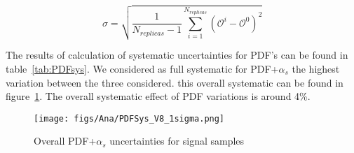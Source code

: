 \begin{equation} \label{eq:quadsumNNPDF}
\sigma = \sqrt{\frac{1}{N_{replicas}-1}\sum_{i=1}^{N_{replicas}}(\mathcal{O}^{i}-\mathcal{O}^{0})^{2}} 
\end{equation}

The results of calculation of systematic uncertainties for PDF's can be found in table~\ref{tab:PDFsys}. We considered as full systematic for PDF+$\alpha_{s}$ the highest variation between the three considered. this overall systematic can be found in figure~\ref{fig:TotalPDFSys}. The overall systematic effect of PDF variations is around 4\%.

\begin{table*}[htbH]
\begin{center}
\caption{PDF+$\alpha_{s}$ uncertainties for signal samples\label{tab:PDFsys}}
\end{center}
\end{table*}

\begin{figure}[!Hhtbp]
  \begin{center}
    \texttt{[image: figs/Ana/PDFSys\_V8\_1sigma.png]}
    \caption{Overall PDF+$\alpha_{s}$ uncertainties for signal samples}
    \label{fig:TotalPDFSys}
  \end{center}
\end{figure}

